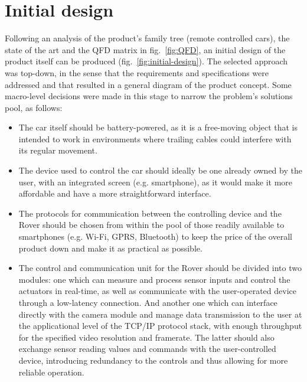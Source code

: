\newpage
\section{Initial design}%
\label{sec:org68fdd80}

Following an analysis of the product’s family tree (remote controlled cars), the state of the art and the QFD matrix in fig.~\ref{fig:QFD}, an initial design of the product itself can be produced (fig.~\ref{fig:initial-design}).
The selected approach was top-down, in the sense that the requirements and specifications were addressed and that resulted in a general diagram of the product concept. Some macro-level decisions were made in this stage to narrow the problem’s solutions pool, as follows:

\begin{itemize}
\item  The car itself should be battery-powered, as it is a free-moving object that is intended to work in environments where trailing cables could interfere with its regular movement.

\item The device used to control the car should ideally be one already owned by the user, with an integrated screen (e.g. smartphone), as it would make it more affordable and have a more straightforward interface.

\item The protocols for communication between the controlling device and the Rover should be chosen from within the pool of those readily available to smartphones (e.g. Wi-Fi, GPRS, Bluetooth) to keep the price of the overall product down and make it as practical as possible.

\item  The control and communication unit for the Rover should be divided into two modules: one which can measure and process sensor inputs and control the actuators in real-time, as well as communicate with the user-operated device through a low-latency connection. And another one which can interface directly with the camera module and manage data transmission to the user at the applicational level of the TCP/IP protocol stack, with enough throughput for the specified video resolution and framerate. The latter should also exchange sensor reading values and commands with the user-controlled device, introducing redundancy to the controls and thus allowing for more reliable operation.

\end{itemize}

